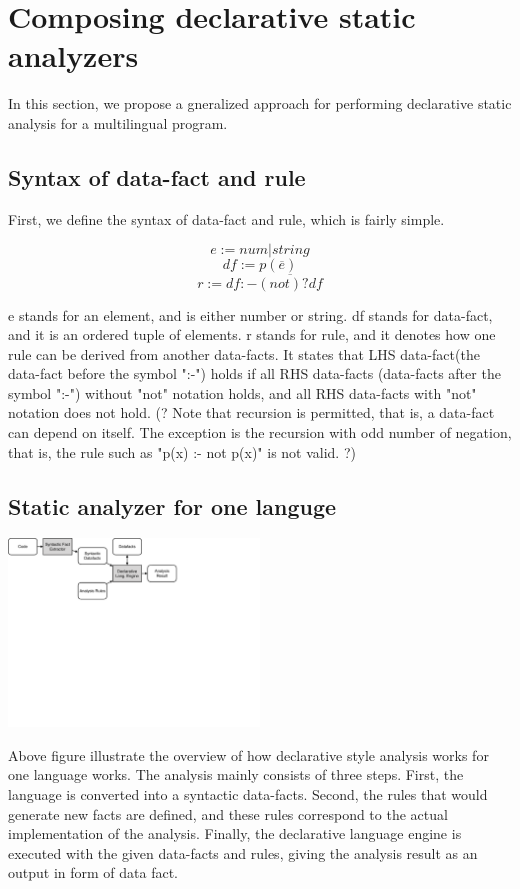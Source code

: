 \section{Composing declarative static analyzers}

In this section, we propose a gneralized approach for performing declarative
static analysis for a multilingual program.

\subsection{Syntax of data-fact and rule}

First, we define the syntax of data-fact and rule, which is fairly simple.

\[e := num | string\]
\[df := p(\overline{e})\]
\[r := df :- \overline{(not)? df}\]

e stands for an element, and is either number or string.  df stands for
data-fact, and it is an ordered tuple of elements.  r stands for rule, and it
denotes how one rule can be derived from another data-facts.  It states that
LHS data-fact(the data-fact before the symbol ":-") holds if all RHS data-facts
(data-facts after the symbol ":-") without "not" notation holds, and all RHS
data-facts with "not" notation does not hold.  (? Note that recursion is
permitted, that is, a data-fact can depend on itself.  The exception is the
recursion with odd number of negation, that is, the rule such as "p(x) :- not
p(x)" is not valid. ?)

\subsection{Static analyzer for one languge}

\includegraphics[width=0.5\textwidth]{img/overview}

Above figure illustrate the overview of how declarative style analysis works for
one language works. The analysis mainly
consists of three steps. First, the language is converted into a syntactic
data-facts. Second, the rules that would generate new facts are defined, and
these rules correspond to the actual implementation of the analysis. Finally, the
declarative language engine is executed with the given data-facts and rules,
giving the analysis result as an output in form of data fact.

